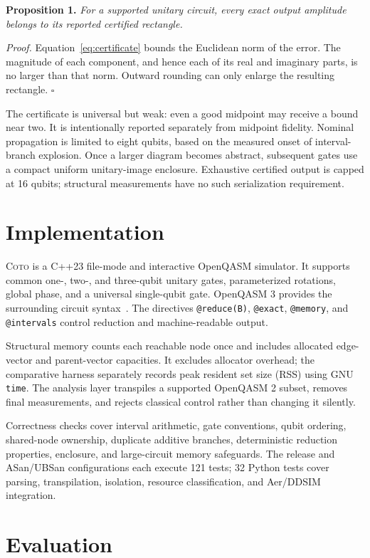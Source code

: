 \documentclass[sigconf,nonacm]{acmart}
\newcommand{\tool}{\textsc{Coto}}
\begin{document}
\noindent\textbf{Proposition 1.} \emph{For a supported unitary circuit, every exact output
amplitude belongs to its reported certified rectangle.}

\noindent\emph{Proof.} Equation~\ref{eq:certificate} bounds the Euclidean norm of the error.
The magnitude of each component, and hence each of its real and imaginary parts, is no larger
than that norm. Outward rounding can only enlarge the resulting rectangle. \hfill$\square$

The certificate is universal but weak: even a good midpoint may receive a bound near two.
It is intentionally reported separately from midpoint fidelity. Nominal propagation is
limited to eight qubits, based on the measured onset of interval-branch explosion. Once a
larger diagram becomes abstract, subsequent gates use a compact uniform unitary-image
enclosure. Exhaustive certified output is capped at 16 qubits; structural measurements have
no such serialization requirement.

\section{Implementation}

\tool{} is a C++23 file-mode and interactive OpenQASM simulator. It supports common one-,
two-, and three-qubit unitary gates, parameterized rotations, global phase, and a universal
single-qubit gate. OpenQASM 3 provides the surrounding circuit syntax~\cite{cross2022openqasm}.
The directives \texttt{@reduce(B)}, \texttt{@exact}, \texttt{@memory}, and
\texttt{@intervals} control reduction and machine-readable output.

Structural memory counts each reachable node once and includes allocated edge-vector and
parent-vector capacities. It excludes allocator overhead; the comparative harness separately
records peak resident set size (RSS) using GNU \texttt{time}. The analysis layer transpiles a
supported OpenQASM 2 subset, removes final measurements, and rejects classical control rather
than changing it silently.

Correctness checks cover interval arithmetic, gate conventions, qubit ordering, shared-node
ownership, duplicate additive branches, deterministic reduction properties, enclosure, and
large-circuit memory safeguards. The release and ASan/UBSan configurations each execute 121
tests; 32 Python tests cover parsing, transpilation, isolation, resource classification, and
Aer/DDSIM integration.

\section{Evaluation}
\end{document}
